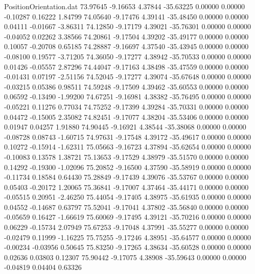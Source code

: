 \begin{filecontents}{PositionOrientation.dat}
  73.97645   -9.16653    4.37844   -35.63225    0.00000    0.00000   -0.10287    0.16222    1.84799
  74.05640   -9.17476    4.39141   -35.48450    0.00000    0.00000    0.04111   -0.01667   -3.86311
  74.12850   -9.17179    4.39021   -35.76301    0.00000    0.00000   -0.04052    0.02262    3.38566
  74.20861   -9.17504    4.39202   -35.49177    0.00000    0.00000    0.10057   -0.20708    0.65185
  74.28887   -9.16697    4.37540   -35.43945    0.00000    0.00000   -0.08100    0.19577   -3.71205
  74.36050   -9.17277    4.38942   -35.70533    0.00000    0.00000    0.01426   -0.05557    2.87296
  74.44047   -9.17163    4.38498   -35.47559    0.00000    0.00000   -0.01431    0.07197   -2.51156
  74.52045   -9.17277    4.39074   -35.67648    0.00000    0.00000   -0.03215    0.05386    0.98511
  74.59248   -9.17509    4.39462   -35.60553    0.00000    0.00000    0.06592   -0.13490   -1.99200
  74.67251   -9.16981    4.38382   -35.76495    0.00000    0.00000   -0.05221    0.11276    0.77034
  74.75252   -9.17399    4.39284   -35.70331    0.00000    0.00000    0.04472   -0.15005    2.35082
  74.82451   -9.17077    4.38204   -35.53406    0.00000    0.00000    0.01947    0.04257    1.91880
  74.90445   -9.16921    4.38544   -35.38068    0.00000    0.00000   -0.08728    0.08743   -1.60715
  74.97631   -9.17548    4.39172   -35.49617    0.00000    0.00000    0.10272   -0.15914   -1.62311
  75.05663   -9.16723    4.37894   -35.62654    0.00000    0.00000   -0.10083    0.13578    1.38721
  75.13653   -9.17529    4.38979   -35.51570    0.00000    0.00000    0.14292   -0.19300   -1.02096
  75.20852   -9.16500    4.37590   -35.58919    0.00000    0.00000   -0.11734    0.18584    0.64430
  75.28849   -9.17439    4.39076   -35.53767    0.00000    0.00000    0.05403   -0.20172    1.20065
  75.36841   -9.17007    4.37464   -35.44171    0.00000    0.00000   -0.05515    0.20951   -2.46250
  75.44054   -9.17405    4.38975   -35.61935    0.00000    0.00000    0.04552   -0.14687    0.63797
  75.52041   -9.17041    4.37802   -35.56840    0.00000    0.00000   -0.05659    0.16427   -1.66619
  75.60069   -9.17495    4.39121   -35.70216    0.00000    0.00000    0.06229   -0.15734    2.07949
  75.67253   -9.17048    4.37991   -35.55277    0.00000    0.00000   -0.02479    0.11999   -1.16225
  75.75255   -9.17246    4.38951   -35.64577    0.00000    0.00000   -0.00234   -0.03956    0.50645
  75.83250   -9.17265    4.38634   -35.60528    0.00000    0.00000    0.02636    0.03803    0.12307
  75.90442   -9.17075    4.38908   -35.59643    0.00000    0.00000   -0.04819    0.04404    0.63326

\end{filecontents}
